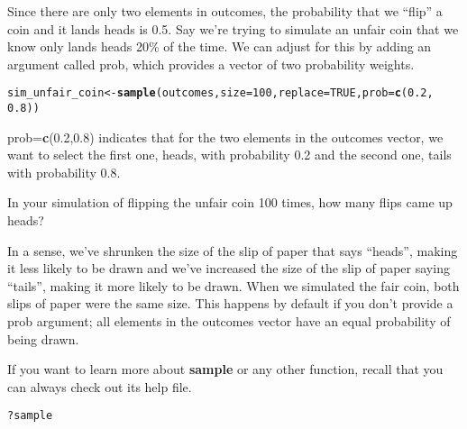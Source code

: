 \documentclass{article}\usepackage[]{graphicx}\usepackage[]{color}
\makeatletter
\newcommand{\hlnum}[1]{\textcolor[rgb]{0.686,0.059,0.569}{#1}}%
\newcommand{\hlstr}[1]{\textcolor[rgb]{0.192,0.494,0.8}{#1}}%
\newcommand{\hlopt}[1]{\textcolor[rgb]{0,0,0}{#1}}%
\newcommand{\hlstd}[1]{\textcolor[rgb]{0.345,0.345,0.345}{#1}}%
\newcommand{\hlkwb}[1]{\textcolor[rgb]{0.69,0.353,0.396}{#1}}%
\newcommand{\hlkwc}[1]{\textcolor[rgb]{0.333,0.667,0.333}{#1}}%
\newcommand{\hlkwd}[1]{\textcolor[rgb]{0.737,0.353,0.396}{\textbf{#1}}}%
\newenvironment{kframe}{%
 \def\at@end@of@kframe{}%
 \ifinner\ifhmode%
  \def\at@end@of@kframe{\end{minipage}}%
  \begin{minipage}{\columnwidth}%
 \fi\fi%
 \def\FrameCommand##1{\hskip\@totalleftmargin \hskip-\fboxsep
 \colorbox{shadecolor}{##1}\hskip-\fboxsep
     \hskip-\linewidth \hskip-\@totalleftmargin \hskip\columnwidth}%
 \MakeFramed {\advance\hsize-\width
   \@totalleftmargin\z@ \linewidth\hsize
   \@setminipage}}%
 {\par\unskip\endMakeFramed%
 \at@end@of@kframe}
\newenvironment{knitrout}{}{} %
\makeatother
\begin{document}
Since there are only two elements in \hlstd{outcomes}, the probability that we ``flip'' a coin and it lands heads is 0.5. Say we're trying to simulate an unfair coin that we know only lands heads 20\% of the time. We can adjust for this by adding an argument called \hlkwc{prob}, which provides a vector of two probability weights.

\begin{knitrout}
\color{fgcolor}\begin{kframe}
\begin{alltt}
\hlstd{sim_unfair_coin} \hlkwb{<-} \hlkwd{sample}\hlstd{(outcomes,} \hlkwc{size} \hlstd{=} \hlnum{100}\hlstd{,} \hlkwc{replace} \hlstd{=} \hlnum{TRUE}\hlstd{,} \hlkwc{prob} \hlstd{=} \hlkwd{c}\hlstd{(}\hlnum{0.2}\hlstd{,}
    \hlnum{0.8}\hlstd{))}
\end{alltt}
\end{kframe}
\end{knitrout}


\hlkwc{prob}\hlkwc{=}\hlkwd{c}\hlnum{(0.2,0.8)} indicates that for the two elements in the \hlstd{outcomes} vector, we want to select the first one, \hlstr{heads}, with probability 0.2 and the second one, \hlstr{tails} with probability 0.8.

\begin{exercise}
In your simulation of flipping the unfair coin 100 times, how many flips came up heads?
\end{exercise}

In a sense, we've shrunken the size of the slip of paper that says ``heads'', making it less likely to be drawn and we've increased the size of the slip of paper saying ``tails'', making it more likely to be drawn. When we simulated the fair coin, both slips of paper were the same size. This happens by default if you don't provide a \hlkwc{prob} argument; all elements in the \hlstd{outcomes} vector have an equal probability of being drawn.

If you want to learn more about \hlkwd{sample} or any other function, recall that you can always check out its help file.

\begin{knitrout}
\color{fgcolor}\begin{kframe}
\begin{alltt}
\hlopt{?}\hlstd{sample}
\end{alltt}
\end{kframe}
\end{knitrout}
\end{document}
